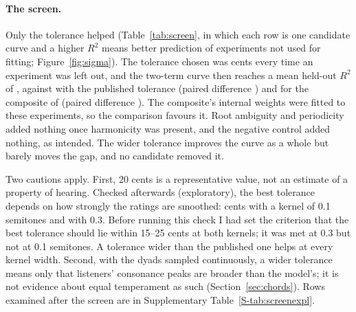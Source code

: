 \documentclass[11pt,a4paper]{article}
\begin{document}
\paragraph{The screen.}
Only the tolerance helped (Table~\ref{tab:screen}, in which each row is one candidate curve
and a higher $R^2$ means better prediction of experiments not used for fitting;
Figure~\ref{fig:sigma}). The tolerance chosen was \scrChosenSigma{} cents every time an
experiment was left out, and the two-term curve then reaches a mean held-out $R^2$ of
\mbRtwoHKHtw, against \mbRtwoHKH{} with the published tolerance (paired difference
\mdRtwoTwVsHKH) and \mbRtwoComp{} for the composite of \citet{marjieh2024} (paired difference
\mdRtwoTwVsComp). The composite's internal weights were fitted to these experiments, so the
comparison favours it. Root ambiguity and periodicity added nothing once harmonicity was
present, and the negative control added nothing, as intended. The wider tolerance improves
the curve as a whole but barely moves the gap, and no candidate removed it.

Two cautions apply. First, 20 cents is a representative value, not an estimate of a property
of hearing. Checked afterwards (exploratory), the best tolerance depends on how strongly the
ratings are smoothed: \rbBestSigmaOne{} cents with a kernel of 0.1 semitones and
\rbBestSigmaThree{} with 0.3. Before running this check I had set the criterion that the
best tolerance should lie within 15--25 cents at both kernels; it was met at 0.3 but not at
0.1 semitones. A tolerance wider than the published one helps at every kernel width. Second,
with the dyads sampled continuously, a wider tolerance means only that listeners' consonance
peaks are broader than the model's; it is not evidence about equal temperament as such
(Section~\ref{sec:chords}). Rows examined after the screen are in Supplementary
Table~\ref{S-tab:screenexpl}.

\begin{table}[t]
\centering
\caption{\emph{This study.} The out-of-sample screen (leave one US experiment out; point estimates).
$R^2$: mean over held-out experiments of the fit to the whole profile (10 US; six harmonic).
Gap, dip: left unexplained, mean of the six harmonic experiments. TT $-$ other (TT, tritone): the dip left unexplained at the tritone minus its mean over the
other 13 whole-number intervals from 1 to 14 semitones, all from the same held-out fit,
averaged over the eight US experiments without stretched or compressed partials.
Stretched: residual dip for stretched partials at 6.00 semitones and at the stretched scale's
tritone, 6.42. SD units. Post-hoc rows: Supplementary Table~\ref{S-tab:screenexpl}.}
\label{tab:screen}
\footnotesize
\setlength{\tabcolsep}{3pt}
\end{table}
\end{document}

